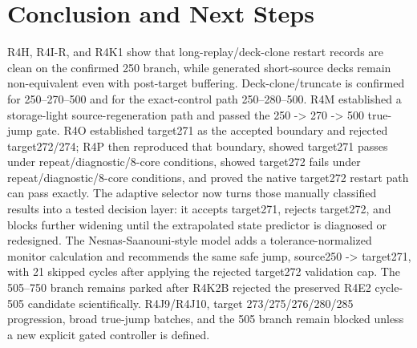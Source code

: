 \documentclass{article}
\begin{document}
\section{Conclusion and Next Steps}
R4H, R4I-R, and R4K1 show that long-replay/deck-clone restart records are clean on the confirmed 250 branch, while generated short-source decks remain non-equivalent even with post-target buffering. Deck-clone/truncate is confirmed for 250--270--500 and for the exact-control path 250--280--500. R4M established a storage-light source-regeneration path and passed the 250 -> 270 -> 500 true-jump gate. R4O established target271 as the accepted boundary and rejected target272/274; R4P then reproduced that boundary, showed target271 passes under repeat/diagnostic/8-core conditions, showed target272 fails under repeat/diagnostic/8-core conditions, and proved the native target272 restart path can pass exactly. The adaptive selector now turns those manually classified results into a tested decision layer: it accepts target271, rejects target272, and blocks further widening until the extrapolated state predictor is diagnosed or redesigned. The Nesnas-Saanouni-style model adds a tolerance-normalized monitor calculation and recommends the same safe jump, source250 -> target271, with 21 skipped cycles after applying the rejected target272 validation cap. The 505--750 branch remains parked after R4K2B rejected the preserved R4E2 cycle-505 candidate scientifically. R4J9/R4J10, target 273/275/276/280/285 progression, broad true-jump batches, and the 505 branch remain blocked unless a new explicit gated controller is defined.
\end{document}
